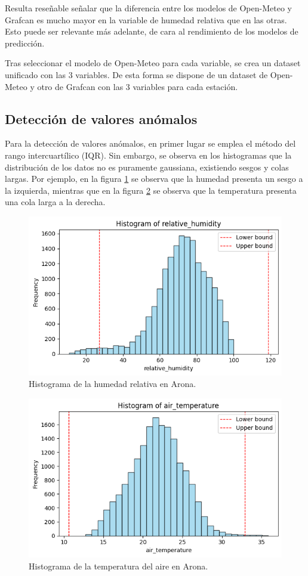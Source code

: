 Resulta reseñable señalar que la diferencia entre los modelos de Open-Meteo y Grafcan es mucho mayor en la variable 
 de humedad relativa que en las otras. Esto puede ser relevante más adelante, de cara al rendimiento de los modelos de predicción. 

 \bigskip
 Tras seleccionar el modelo de Open-Meteo para cada variable, se crea un dataset unificado con las 3 variables. De esta forma se dispone 
 de un dataset de Open-Meteo y otro de Grafcan con las 3 variables para cada estación.

\subsection{Detección de valores anómalos}
Para la detección de valores anómalos, en primer lugar se emplea el método del rango intercuartílico (IQR). 
Sin embargo, se observa en los histogramas que la distribución de los datos no es puramente gaussiana, existiendo sesgos y colas largas.
Por ejemplo, en la figura \ref{histogram_1} se observa que la humedad presenta un sesgo a la izquierda, mientras que en la figura 
\ref{histogram_2} se observa que la temperatura presenta una cola larga a la derecha.

\begin{figure}
    \centering
    \includegraphics[width=.5\linewidth]{images/histogram_humidity.png}
    \caption{Histograma de la humedad relativa en Arona.}
    \label{histogram_1}
\end{figure}

\begin{figure}
    \centering
    \includegraphics[width=.5\linewidth]{images/histogram_temperature.png}
    \caption{Histograma de la temperatura del aire en Arona.}
    \label{histogram_2}
\end{figure}

